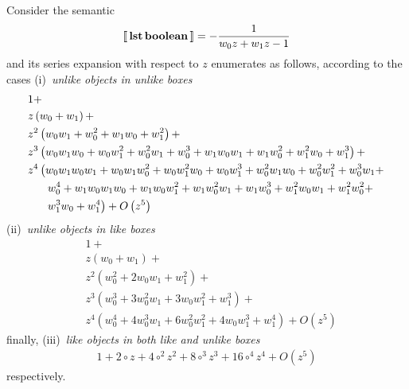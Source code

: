 \begin{example}
Consider the semantic
\begin{displaymath}
    \left\llbracket\,\textbf{lst}\,\textbf{boolean}\,\right\rrbracket = - \frac{1}{w_{0} z + w_{1} z - 1}
\end{displaymath}
and its series expansion with respect to $z$ enumerates as follows,
according to the cases (i)~\textit{unlike objects in unlike boxes}
\begin{displaymath}
\begin{split}
&1 + \\
&z \left(w_{0} + w_{1}\right) + \\
&z^{2} \left(w_{0} w_{1} + w_{0}^{2} + w_{1} w_{0} + w_{1}^{2}\right) + \\
&z^{3} \left(w_{0} w_{1} w_{0} + w_{0} w_{1}^{2} + w_{0}^{2} w_{1} + w_{0}^{3} + w_{1} w_{0} w_{1} + w_{1} w_{0}^{2} + w_{1}^{2} w_{0} + w_{1}^{3}\right) + \\
&z^{4} \left(w_{0} w_{1} w_{0} w_{1} + w_{0} w_{1} w_{0}^{2} + w_{0} w_{1}^{2} w_{0} + w_{0} w_{1}^{3} + w_{0}^{2} w_{1} w_{0} + w_{0}^{2} w_{1}^{2} + w_{0}^{3} w_{1} +\right.\\
&\indent\left.w_{0}^{4} + w_{1} w_{0} w_{1} w_{0} + w_{1} w_{0} w_{1}^{2} + w_{1} w_{0}^{2} w_{1} + w_{1} w_{0}^{3} + w_{1}^{2} w_{0} w_{1} + w_{1}^{2} w_{0}^{2} + \right.\\
&\indent\left.w_{1}^{3} w_{0} + w_{1}^{4}\right) + O\left(z^{5}\right)
\end{split}
\end{displaymath}
(ii)~\textit{unlike objects in like boxes}
\begin{displaymath}
\begin{split}
&1 + \\
&z \left(w_{0} + w_{1}\right) + \\
&z^{2} \left(w_{0}^{2} + 2 w_{0} w_{1} + w_{1}^{2}\right) + \\
&z^{3} \left(w_{0}^{3} + 3 w_{0}^{2} w_{1} + 3 w_{0} w_{1}^{2} + w_{1}^{3}\right) + \\
&z^{4} \left(w_{0}^{4} + 4 w_{0}^{3} w_{1} + 6 w_{0}^{2} w_{1}^{2} + 4 w_{0} w_{1}^{3} + w_{1}^{4}\right) + O\left(z^{5}\right)
\end{split}
\end{displaymath}
finally, (iii)~\textit{like objects in both like and unlike boxes}
\begin{displaymath}
\begin{split}
1 + 2 \circ z + 4 \circ^{2} z^{2} + 8 \circ^{3} z^{3} + 16 \circ^{4} z^{4} + O\left(z^{5}\right)
\end{split}
\end{displaymath}
respectively.
\end{example}

